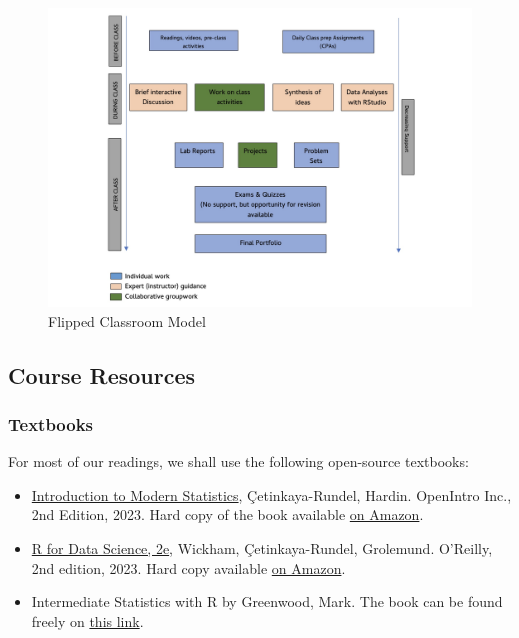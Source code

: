 \documentclass[
  letterpaper,
  DIV=11,
  numbers=noendperiod]{scrartcl}
\begin{document}
\begin{figure}[H]

{\centering \includegraphics{flip.jpeg}

}

\caption{Flipped Classroom Model}

\end{figure}%

\subsection{Course Resources}\label{course-resources}

\subsubsection{Textbooks}\label{textbooks}

For most of our readings, we shall use the following open-source
textbooks:

\begin{itemize}
\item
  \href{https://openintro-ims.netlify.app/}{Introduction to Modern
  Statistics}, Çetinkaya-Rundel, Hardin. OpenIntro Inc., 2nd Edition,
  2023. Hard copy of the book available
  \href{https://www.amazon.com/dp/1943450277?ref=cm_sw_r_cp_ud_dp_84X75NFMXXJ0N6NTJAEF&ref_=cm_sw_r_cp_ud_dp_84X75NFMXXJ0N6NTJAEF&social_share=cm_sw_r_cp_ud_dp_84X75NFMXXJ0N6NTJAEF&skipTwisterOG=2}{on
  Amazon}.
\item
  \href{https://r4ds.hadley.nz/}{R for Data Science, 2e}, Wickham,
  Çetinkaya-Rundel, Grolemund. O'Reilly, 2nd edition, 2023. Hard copy
  available
  \href{https://www.amazon.com/dp/1492097403?&tag=hadlwick-20}{on
  Amazon}.
\item
  Intermediate Statistics with R by Greenwood, Mark. The book can be
  found freely on
  \href{https://open.umn.edu/opentextbooks/textbooks/1078}{this link}.
\end{itemize}
\end{document}

